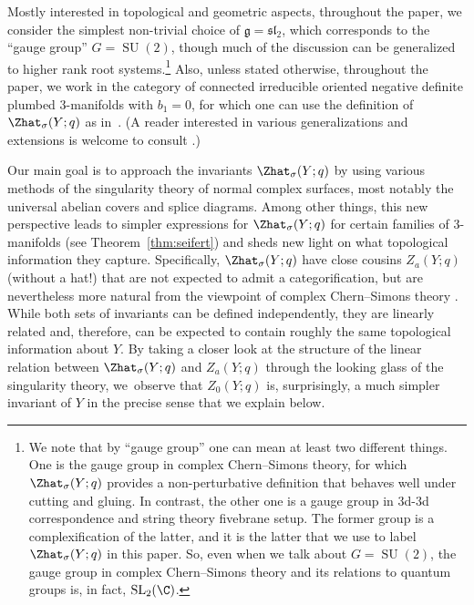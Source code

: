 \documentclass[10pt,a4paper]{amsart}
\begin{document}
Mostly interested in topological and geometric aspects, throughout the paper, we consider the simplest non-trivial choice of $\mathfrak{g} = \mathfrak{sl}_2$, which corresponds to the ``gauge group'' $G = \operatorname{SU}(2)$, though much of the discussion can be generalized to higher rank root systems.\footnote{We note that by ``gauge group'' one can mean at least two different things. One is the gauge group in complex Chern--Simons theory, for which $\Zhat_{\sigma}(Y; q)$ provides a non-perturbative definition that behaves well under cutting and gluing. In contrast, the other one is a gauge group in 3d-3d correspondence and string theory fivebrane setup. The former group is a complexification of the latter, and it is the latter that we use to label $\Zhat_{\sigma}(Y; q)$ in this paper. So, even when we talk about $G = \operatorname{SU}(2)$, the gauge group in complex Chern--Simons theory and its relations to quantum groups is, in fact, $\operatorname{SL}_2(\C)$.} Also, unless stated otherwise, throughout the paper, we work in the category of connected irreducible oriented negative definite plumbed 3-manifolds \cite{Neu81} with $b_1 = 0$, for which one can use the definition of~$\Zhat_{\sigma}(Y; q)$ as in~\cite{GPPV20}. (A reader interested in various generalizations and extensions is welcome to consult \cite{AJK21,Chae21, GM21, Pa20a, Pa20b, Pa21, Ri22}.)

Our main goal is to approach the invariants $\Zhat_{\sigma}(Y; q)$ by using various methods of the singularity theory of normal complex surfaces, most notably the universal abelian covers and splice diagrams. Among other things, this new perspective leads to simpler expressions for $\Zhat_{\sigma}(Y; q)$ for certain families of 3-manifolds (see Theorem~\ref{thm:seifert}) and sheds new light on what topological information they capture.
Specifically, $\Zhat_{\sigma}(Y; q)$ have close cousins $Z_a(Y; q)$ (without a hat!) that are not expected to admit a categorification, but are nevertheless more natural from the viewpoint of complex Chern--Simons theory \cite{GMP16}. While both sets of invariants can be defined independently, they are linearly related and, therefore, can be expected to contain roughly the same topological information about $Y$. By taking a closer look at the structure of the linear relation between $\Zhat_{\sigma}(Y; q)$ and $Z_a(Y; q)$ through the looking glass of the singularity theory, we~observe that $Z_0(Y; q)$ is, surprisingly, a much simpler invariant of $Y$ in the precise sense that we explain below.
\end{document}

